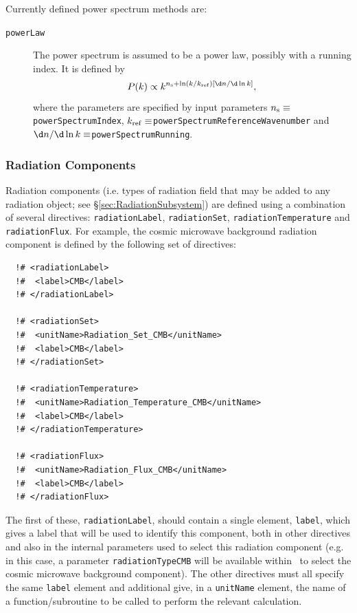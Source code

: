 Currently defined power spectrum methods are:
\begin{description}
 \item [{\tt powerLaw}] The power spectrum is assumed to be a power law, possibly with a running index. It is defined by
\begin{equation}
 P(k)\propto k^{n_{\rm s} + \ln(k/k_{\rm ref}) [\d n /\d\ln k]},
\end{equation}
where the parameters are specified by input parameters $n_{\rm s}\equiv${\tt powerSpectrumIndex}, $k_{\rm ref}\equiv${\tt powerSpectrumReferenceWavenumber} and $\d n / \d \ln k \equiv${\tt powerSpectrumRunning}.
\end{description}

\subsubsection{Radiation Components}\label{sec:radiationComponents}

Radiation components (i.e. types of radiation field that may be added to any radiation object; see \S\ref{sec:RadiationSubsystem}) are defined using a combination of several directives: {\tt radiationLabel}, {\tt radiationSet}, {\tt radiationTemperature} and {\tt radiationFlux}. For example, the cosmic microwave background radiation component is defined by the following set of directives:
\begin{verbatim}
  !# <radiationLabel>
  !#  <label>CMB</label>
  !# </radiationLabel>

  !# <radiationSet>
  !#  <unitName>Radiation_Set_CMB</unitName>
  !#  <label>CMB</label>
  !# </radiationSet>

  !# <radiationTemperature>
  !#  <unitName>Radiation_Temperature_CMB</unitName>
  !#  <label>CMB</label>
  !# </radiationTemperature>

  !# <radiationFlux>
  !#  <unitName>Radiation_Flux_CMB</unitName>
  !#  <label>CMB</label>
  !# </radiationFlux>
\end{verbatim}
The first of these, {\tt radiationLabel}, should contain a single element, {\tt label}, which gives a label that will be used to identify this component, both in other directives and also in the internal parameters used to select this radiation component (e.g. in this case, a parameter {\tt radiationTypeCMB} will be available within \glc\ to select the cosmic microwave background component). The other directives must all specify the same {\tt label} element and additional give, in a {\tt unitName} element, the name of a function/subroutine to be called to perform the relevant calculation.

